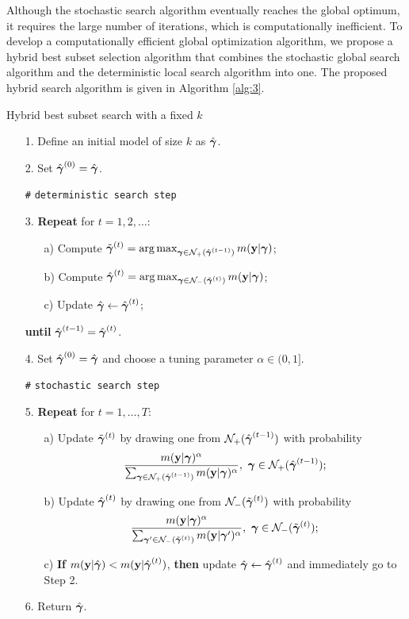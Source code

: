 Although the stochastic search algorithm eventually reaches the global optimum, it requires the large number of iterations, which is computationally inefficient. To develop a computationally efficient global optimization algorithm, we propose a hybrid best subset selection algorithm that combines the stochastic global search algorithm and the deterministic local search algorithm into one. The proposed hybrid search algorithm is given in Algorithm \ref{alg:3}.
\begin{algorithm}[ht!]
\caption{Hybrid best subset search with a fixed $k$}\label{alg:3}
\begin{itemize}\itemsep=0pt
\item[1.] Define an initial model of size $k$ as $\hat{{\boldsymbol \gamma}}$.
\item[2.] Set $\hat{{\boldsymbol \gamma}}^{(0)}=\hat{{\boldsymbol \gamma}}$.
\item[\texttt{\#}] \texttt{deterministic search step}
\item[3.] \textbf{Repeat} for $t=1,2,\ldots:$ 
\begin{itemize}\itemsep=0pt
\item[a)] Compute $\tilde{{\boldsymbol \gamma}}^{(t)} = \arg\max_{{\boldsymbol \gamma}  \in \mathcal{N}_+(\hat{{\boldsymbol \gamma}}^{(t-1)} ) } m({\bf y}|{\boldsymbol \gamma})$; 
\item[b)] Compute $\hat{{\boldsymbol \gamma}}^{(t)}=  \arg\max_{{\boldsymbol \gamma}  \in \mathcal{N}_-(\tilde{{\boldsymbol \gamma}}^{(t)} ) } m({\bf y}|{\boldsymbol \gamma})$;
\item[c)] Update $\hat{{\boldsymbol \gamma}}\leftarrow \hat{{\boldsymbol \gamma}}^{(t)}$;
\end{itemize}
\item[] \textbf{until} $\hat{{\boldsymbol \gamma}}^{(t-1)}=\hat{{\boldsymbol \gamma}}^{(t)}$.
\item[4.] Set $\hat{{\boldsymbol \gamma}}^{(0)}=\hat{{\boldsymbol \gamma}}$ and choose a tuning parameter $\alpha \in (0,1]$.
\item[\quad \texttt{\#}] \texttt{stochastic search step}
\item[5.] \textbf{Repeat} for $t=1,\ldots,T$: 
\begin{itemize}
\item[a)] Update $\tilde{{\boldsymbol \gamma}}^{(t)}$ by drawing one from $\mathcal{N}_+(\hat{{\boldsymbol \gamma}}^{(t-1)} )$ with probability $$\frac{m({\bf y}|{\boldsymbol \gamma})^\alpha}{\sum_{{\boldsymbol \gamma}\in \mathcal{N}_+(\hat{{\boldsymbol \gamma}}^{(t-1)} ) } m({\bf y}|{\boldsymbol \gamma})^\alpha},~{\boldsymbol \gamma} \in \mathcal{N}_+(\hat{{\boldsymbol \gamma}}^{(t-1)} );$$
\item[b)] Update $\hat{{\boldsymbol \gamma}}^{(t)}$ by drawing one from $\mathcal{N}_-(\tilde{{\boldsymbol \gamma}}^{(t)} )$ with probability $$\frac{m({\bf y}|{\boldsymbol \gamma})^\alpha}{\sum_{{\boldsymbol \gamma}' \in \mathcal{N}_-(\tilde{{\boldsymbol \gamma}}^{(t)} ) } m({\bf y}|{\boldsymbol \gamma}')^\alpha },~{\boldsymbol \gamma} \in \mathcal{N}_-(\tilde{{\boldsymbol \gamma}}^{(t)} );$$
\item[c)] \textbf{If} $m({\bf y}|\hat{{\boldsymbol \gamma}})<m({\bf y}|\hat{{\boldsymbol \gamma}}^{(t)})$, \textbf{then} update $\hat{{\boldsymbol \gamma}}\leftarrow \hat{{\boldsymbol \gamma}}^{(t)}$ and immediately go to Step 2.
\end{itemize}
\item[6.] Return $\hat{{\boldsymbol \gamma}}$.
\end{itemize}
\end{algorithm}
